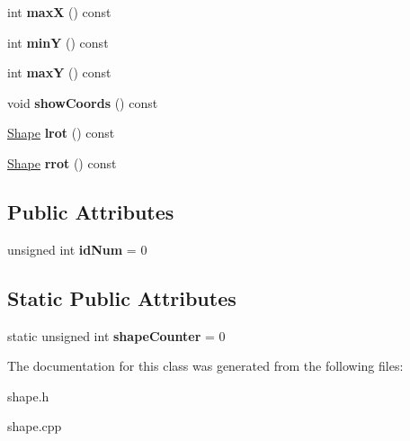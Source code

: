 \begin{DoxyCompactItemize}
\item 
\hypertarget{class_tetris_1_1_shape_a507b2c15c9da137051b579237b3348da}{int {\bfseries max\-X} () const }\label{class_tetris_1_1_shape_a507b2c15c9da137051b579237b3348da}

\item 
\hypertarget{class_tetris_1_1_shape_aa227cd9cb83465ae58b69f2c9bf6d9ef}{int {\bfseries min\-Y} () const }\label{class_tetris_1_1_shape_aa227cd9cb83465ae58b69f2c9bf6d9ef}

\item 
\hypertarget{class_tetris_1_1_shape_a0dd5e0b4b728b3a1e02ba381d90e7a3b}{int {\bfseries max\-Y} () const }\label{class_tetris_1_1_shape_a0dd5e0b4b728b3a1e02ba381d90e7a3b}

\item 
\hypertarget{class_tetris_1_1_shape_a9126ac01d08475dfe729ae04d4429be5}{void {\bfseries show\-Coords} () const }\label{class_tetris_1_1_shape_a9126ac01d08475dfe729ae04d4429be5}

\item 
\hypertarget{class_tetris_1_1_shape_ada25de7eeb1d206f41f484338ca6a3cd}{\hyperlink{class_tetris_1_1_shape}{Shape} {\bfseries lrot} () const }\label{class_tetris_1_1_shape_ada25de7eeb1d206f41f484338ca6a3cd}

\item 
\hypertarget{class_tetris_1_1_shape_aff2bb67d1bf30f8398fd670e8a0da0a2}{\hyperlink{class_tetris_1_1_shape}{Shape} {\bfseries rrot} () const }\label{class_tetris_1_1_shape_aff2bb67d1bf30f8398fd670e8a0da0a2}

\end{DoxyCompactItemize}
\subsection*{Public Attributes}
\begin{DoxyCompactItemize}
\item 
\hypertarget{class_tetris_1_1_shape_af7522c63b46b405a89b9975d8c9c8792}{unsigned int {\bfseries id\-Num} = 0}\label{class_tetris_1_1_shape_af7522c63b46b405a89b9975d8c9c8792}

\end{DoxyCompactItemize}
\subsection*{Static Public Attributes}
\begin{DoxyCompactItemize}
\item 
\hypertarget{class_tetris_1_1_shape_adba48f3c02a4226d8a8260d246013658}{static unsigned int {\bfseries shape\-Counter} = 0}\label{class_tetris_1_1_shape_adba48f3c02a4226d8a8260d246013658}

\end{DoxyCompactItemize}


The documentation for this class was generated from the following files\-:\begin{DoxyCompactItemize}
\item 
shape.\-h\item 
shape.\-cpp\end{DoxyCompactItemize}
